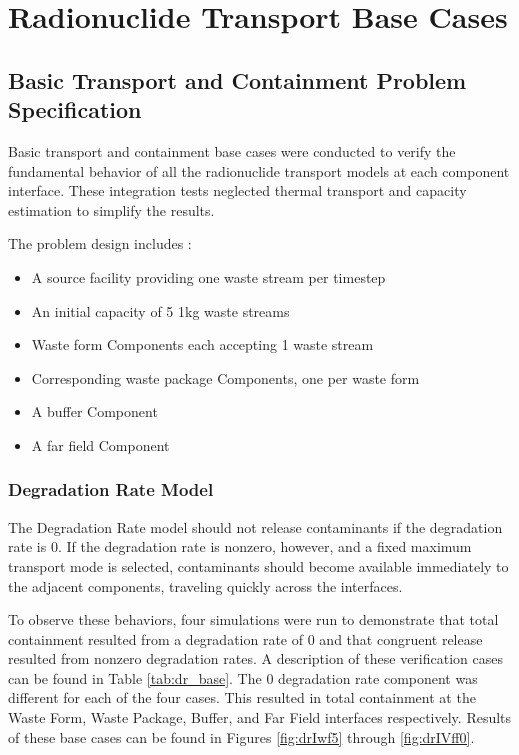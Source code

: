 \section{Radionuclide Transport Base Cases}\label{sec:nuclide_base_cases}
\subsection{Basic Transport and Containment Problem Specification}
Basic transport and containment base cases were conducted to verify the 
fundamental behavior of all the radionuclide transport models at each component 
interface. These integration tests neglected thermal transport and capacity 
estimation to simplify the results.  

The problem design includes : 
\begin{itemize}
\item{A source facility providing one waste stream per timestep}
\item{An initial capacity of 5 1kg waste streams}
\item{Waste form Components each accepting 1 waste stream} 
\item{Corresponding waste package Components, one per waste form}
\item{A buffer Component}
\item{A far field Component}
\end{itemize}

\subsubsection{Degradation Rate Model}
The Degradation Rate model should not release contaminants if the degradation 
rate is 0. If the degradation rate is nonzero, however, and a fixed maximum 
transport mode is selected, contaminants should become available immediately to 
the adjacent components, traveling quickly across the interfaces. 

To observe these behaviors, four simulations were run to demonstrate that total 
containment resulted from a degradation rate of 0 and that congruent release 
resulted from nonzero degradation rates. A description of these verification 
cases can be found in Table \ref{tab:dr_base}. The 0 degradation rate component was 
different for each of the four cases. This resulted in total containment at the 
Waste Form, Waste Package, Buffer, and Far Field interfaces respectively. 
Results of these base cases can be found in Figures 
\ref{fig:drIwf5} through \ref{fig:drIVff0}.
\FloatBarrier


\FloatBarrier

